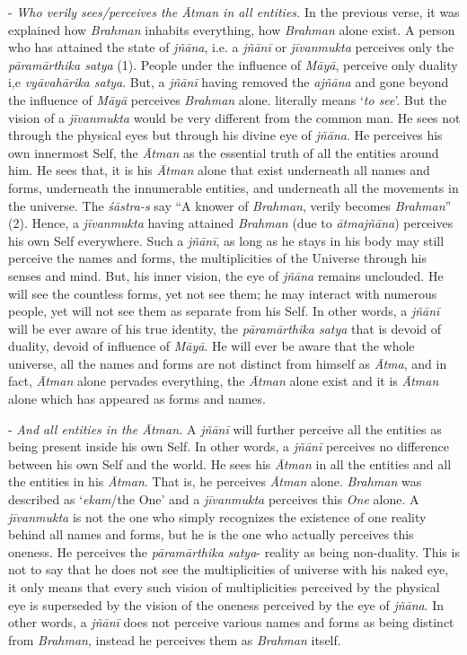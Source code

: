 - \emph{Who verily sees/perceives the Ātman in all entities.} In the previous verse, it was explained how \emph{Brahman} inhabits everything, how \emph{Brahman} alone exist. A person who has attained the state of \emph{jñāna}, i.e. a \emph{jñānī} or \emph{jīvanmukta} perceives only the \emph{pāramārthika satya} (1). People under the influence of \emph{Māyā}, perceive only duality i,e \emph{vyāvahārika satya}. But, a \emph{jñānī} having removed the \emph{ajñāna} and gone beyond the influence of \emph{Māyā} perceives \emph{Brahman} alone.  literally means `\emph{to see}'. But the vision of a \emph{jīvanmukta} would be very different from the common man. He sees not through the physical eyes but through his divine eye of \emph{jñāna}. He perceives his own innermost Self, the \emph{Ātman} as the essential truth of all the entities around him. He sees that, it is his \emph{Ātman} alone that exist underneath all names and forms, underneath the innumerable entities, and underneath all the movements in the universe. The \emph{śāstra-s} say ``A knower of \emph{Brahman}, verily becomes \emph{Brahman}'' (2). Hence, a \emph{jīvanmukta} having attained \emph{Brahman} (due to \emph{ātmajñāna}) perceives his own Self everywhere. Such a \emph{jñānī}, as long as he stays in his body may still perceive the names and forms, the multiplicities of the Universe through his senses and mind. But, his inner vision, the eye of \emph{jñāna} remains unclouded. He will see the countless forms, yet not see them; he may interact with numerous people, yet will not see them as separate from his Self. In other words, a \emph{jñānī} will be ever aware of his true identity, the \emph{pāramārthika satya} that is devoid of duality, devoid of influence of \emph{Māyā}. He will ever be aware that the whole universe, all the names and forms are not distinct from himself as \emph{Ātma}, and in fact, \emph{Ātman} alone pervades everything, the \emph{Ātman} alone exist and it is \emph{Ātman} alone which has appeared as forms and names.

- \emph{And all entities in the Ātman.} A \emph{jñānī} will further perceive all the entities as being present inside his own Self. In other words, a \emph{jñānī} perceives no difference between his own Self and the world. He sees his \emph{Ātman} in all the entities and all the entities in his \emph{Ātman}. That is, he perceives \emph{Ātman} alone. \emph{Brahman} was described as `\emph{ekam}/the One' and a \emph{jīvanmukta} perceives this \emph{One} alone. A \emph{jīvanmukta} is not the one who simply recognizes the existence of one reality behind all names and forms, but he is the one who actually perceives this oneness. He perceives the \emph{pāramārthika satya}- reality as being non-duality. This is not to say that he does not see the multiplicities of universe with his naked eye, it only means that every such vision of multiplicities perceived by the physical eye is superseded by the vision of the oneness perceived by the eye of \emph{jñāna}. In other words, a \emph{jñānī} does not perceive various names and forms as being distinct from \emph{Brahman}, instead he perceives them as \emph{Brahman} itself.

